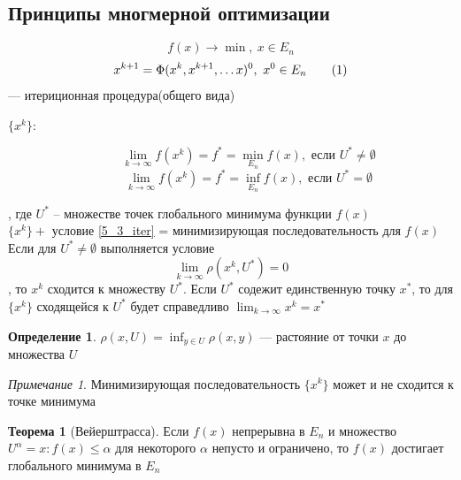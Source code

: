\documentclass[oneside]{book}
\newcommand\addtag{\refstepcounter{equation}\tag{\theequation}}
\theoremstyle{plain}
\theoremstyle{remark}
\newtheorem*{remark}{Примечание}
\theoremstyle{definition}
\newtheorem{theorem}{Теорема}[section]
\newtheorem*{definition}{Определение}
\begin{document}
\subsection{Принципы многмерной оптимизации}
\label{sec:orgc2be0a9}
\[ f(x) \to \min,\ x \in E_n \]
\[ x^{k + 1} = \Phi(x^k, x^{k + 1}, \dots x)^0,\ x^0 \in E_n \addtag\label{5_3_iter} \]
--- итериционная процедура(общего вида)
\begin{description}
\item[{\(\{x^k\}\):}] \[ \lim_{k \to \infty} f(x^k) = f^* = \min_{E_n} f(x), \text{ если } U^* \neq \emptyset \]
\[ \lim_{k \to \infty} f(x^k) = f^* = \inf_{E_n} f(x), \text{ если } U^* = \emptyset \]
\end{description}
, где \(U^*\) -- множестве точек глобального минимума функции \(f(x)\) \\
\(\{x^k\} +\) условие \ref{5_3_iter} = минимизирующая последовательность для \(f(x)\) \\
Если для \(U^* \neq \emptyset\) выполняется условие
\[ \lim_{k \to \infty} \rho(x^k, U^*) = 0 \], то \(x^k\) сходится к множеству \(U^*\). Если \(U^*\) содежит единственную точку \(x^*\), то для \(\{x^k\}\) сходящейся к \(U^*\) будет справедливо \(\lim_{k \to \infty} x^k = x^*\)
\begin{definition}
\(\rho(x, U) = \inf_{y \in U}\rho(x, y)\) --- растояние от точки \(x\) до множества \(U\)
\end{definition}
\begin{remark}
Минимизирующая последовательность \(\{x^k\}\) может и не сходится к точке минимума
\end{remark}
\begin{theorem}[Вейерштрасса]
Если \(f(x)\) непрерывна в \(E_n\) и множество \(U^\alpha = {x: f(x) \le \alpha}\) для некоторого \(\alpha\) непусто и ограничено, то \(f(x)\) достигает глобального минимума в \(E_n\)
\end{theorem}
\end{document}
